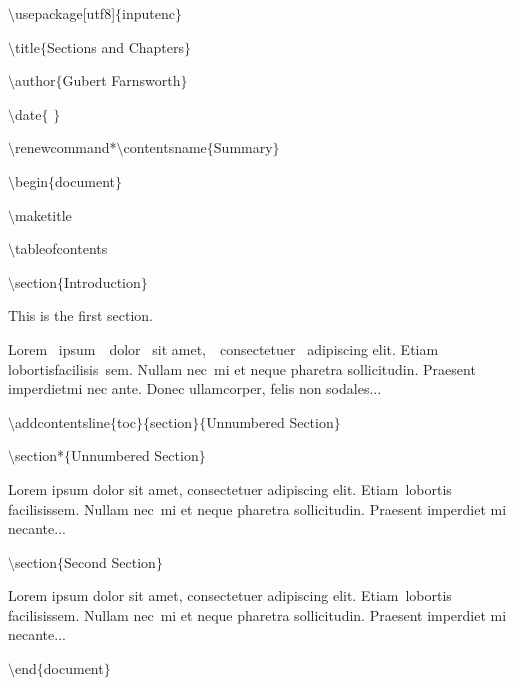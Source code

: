 $\setminus$usepackage[utf8]$ \{ $inputenc$ \} $\par

$\setminus$title$ \{ $Sections and Chapters$ \} $\par

$\setminus$author$ \{ $Gubert Farnsworth$ \} $\par

$\setminus$date$ \{ $ $ \} $\par

$\setminus$renewcommand*$\setminus$contentsname$ \{ $Summary$ \} $\par

$\setminus$begin$ \{ $document$ \} $\par

$\setminus$maketitle\par

$\setminus$tableofcontents\par

$\setminus$section$ \{ $Introduction$ \} $\par

This is the first section.\par


Lorem~ ipsum~~dolor~ sit  amet,~~consectetuer~ adipiscing  elit. Etiam~ lobortisfacilisis~sem.  Nullam nec~mi et neque pharetra sollicitudin.  Praesent imperdietmi nec ante. Donec ullamcorper, felis non sodales...\par



$\setminus$addcontentsline$ \{ $toc$ \} $$ \{ $section$ \} $$ \{ $Unnumbered Section$ \} $\par

$\setminus$section*$ \{ $Unnumbered Section$ \} $\par


Lorem ipsum dolor sit amet, consectetuer adipiscing elit. Etiam~lobortis facilisissem.  Nullam nec~mi et neque pharetra sollicitudin.  Praesent imperdiet mi necante...\par



$\setminus$section$ \{ $Second Section$ \} $\par


Lorem ipsum dolor sit amet, consectetuer adipiscing elit. Etiam~lobortis facilisissem.  Nullam nec~mi et neque pharetra sollicitudin.  Praesent imperdiet mi necante...\par




\noindent  \hspace*{0.5in}$\setminus$end$ \{ $document$ \} $\par

